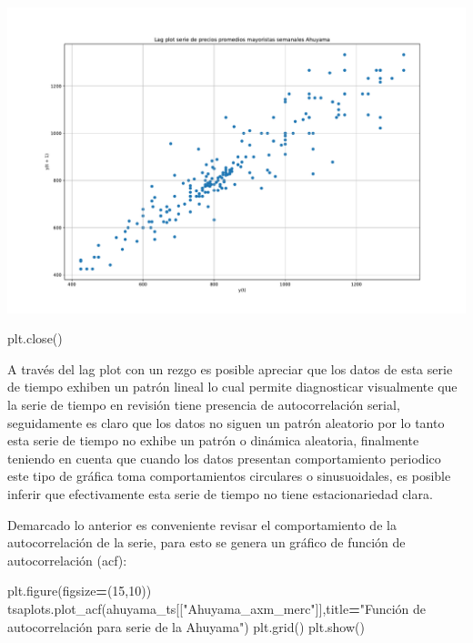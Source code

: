 \documentclass[
]{book}
\newenvironment{Shaded}{\begin{snugshade}}{\end{snugshade}}
\newcommand{\DecValTok}[1]{\textcolor[rgb]{0.00,0.00,0.81}{#1}}
\newcommand{\NormalTok}[1]{#1}
\newcommand{\OperatorTok}[1]{\textcolor[rgb]{0.81,0.36,0.00}{\textbf{#1}}}
\newcommand{\StringTok}[1]{\textcolor[rgb]{0.31,0.60,0.02}{#1}}
\begin{document}
\includegraphics{bookdown-demo_files/figure-latex/unnamed-chunk-46-3.pdf}

\begin{Shaded}
\begin{Highlighting}[]
\NormalTok{plt.close()}
\end{Highlighting}
\end{Shaded}

A través del lag plot con un rezgo es posible apreciar que los datos de esta serie de tiempo exhiben un patrón lineal lo cual permite diagnosticar visualmente que la serie de tiempo en revisión tiene presencia de autocorrelación serial, seguidamente es claro que los datos no siguen un patrón aleatorio por lo tanto esta serie de tiempo no exhibe un patrón o dinámica aleatoria, finalmente teniendo en cuenta que cuando los datos presentan comportamiento periodico este tipo de gráfica toma comportamientos circulares o sinusuoidales, es posible inferir que efectivamente esta serie de tiempo no tiene estacionariedad clara.

Demarcado lo anterior es conveniente revisar el comportamiento de la autocorrelación de la serie, para esto se genera un gráfico de función de autocorrelación (acf):

\begin{Shaded}
\begin{Highlighting}[]

\NormalTok{plt.figure(figsize}\OperatorTok{=}\NormalTok{(}\DecValTok{15}\NormalTok{,}\DecValTok{10}\NormalTok{))}
\NormalTok{tsaplots.plot\_acf(ahuyama\_ts[[}\StringTok{"Ahuyama\_axm\_merc"}\NormalTok{]],title}\OperatorTok{=}\StringTok{"Función de autocorrelación para serie de la Ahuyama"}\NormalTok{)}
\NormalTok{plt.grid()}
\NormalTok{plt.show()}
\end{Highlighting}
\end{Shaded}
\end{document}
